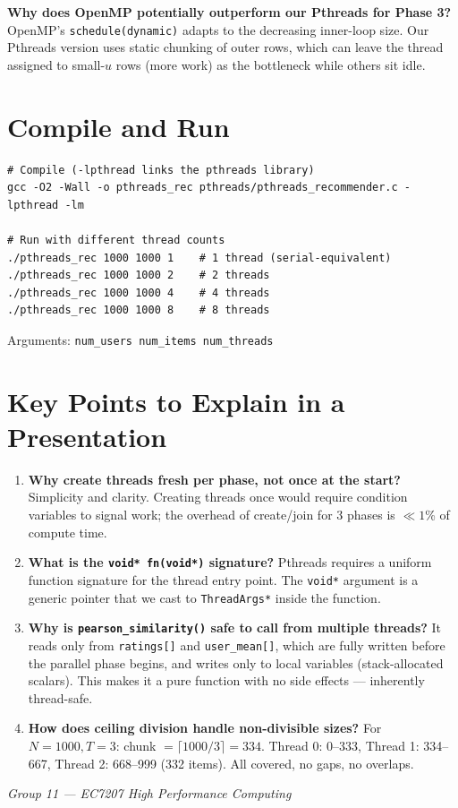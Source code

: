 \documentclass[12pt,a4paper]{article}
\begin{document}
\textbf{Why does OpenMP potentially outperform our Pthreads for Phase 3?}
OpenMP's \texttt{schedule(dynamic)} adapts to the decreasing inner-loop
size.  Our Pthreads version uses static chunking of outer rows, which
can leave the thread assigned to small-$u$ rows (more work) as the
bottleneck while others sit idle.

\section{Compile and Run}

\begin{verbatim}
# Compile (-lpthread links the pthreads library)
gcc -O2 -Wall -o pthreads_rec pthreads/pthreads_recommender.c -lpthread -lm

# Run with different thread counts
./pthreads_rec 1000 1000 1    # 1 thread (serial-equivalent)
./pthreads_rec 1000 1000 2    # 2 threads
./pthreads_rec 1000 1000 4    # 4 threads
./pthreads_rec 1000 1000 8    # 8 threads
\end{verbatim}

Arguments: \texttt{num\_users num\_items num\_threads}

\section{Key Points to Explain in a Presentation}

\begin{enumerate}
    \item \textbf{Why create threads fresh per phase, not once at the start?}
          Simplicity and clarity.  Creating threads once would require condition
          variables to signal work; the overhead of create/join for
          3 phases is $\ll 1$\% of compute time.
    \item \textbf{What is the \texttt{void* fn(void*)} signature?}  Pthreads
          requires a uniform function signature for the thread entry point.  The
          \texttt{void*} argument is a generic pointer that we cast to
          \texttt{ThreadArgs*} inside the function.
    \item \textbf{Why is \texttt{pearson\_similarity()} safe to call from multiple threads?}
          It reads only from \texttt{ratings[]} and \texttt{user\_mean[]},
          which are fully written before the parallel phase begins, and writes
          only to local variables (stack-allocated scalars).  This makes it a
          pure function with no side effects — inherently thread-safe.
    \item \textbf{How does ceiling division handle non-divisible sizes?}
          For $N=1000, T=3$: chunk $= \lceil 1000/3 \rceil = 334$.
          Thread 0: 0--333, Thread 1: 334--667, Thread 2: 668--999 (332 items).
          All covered, no gaps, no overlaps.
\end{enumerate}

\vfill
\begin{center}
    \small\textit{Group 11 — EC7207 High Performance Computing}
\end{center}
\end{document}
